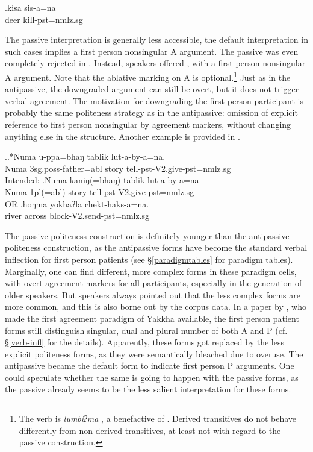 \exg.kisa sis-a=na\\
deer kill{\sc [3sg]-pst=nmlz.sg}\\
 

The passive interpretation is generally less accessible, the default interpretation in such cases implies a first person nonsingular A argument. The passive was even completely rejected in \Next[a]. Instead, speakers  offered \Next[b], with a first person nonsingular A argument. Note that the ablative marking on A is optional.\footnote{The verb is \emph{lumbiʔma} , a benefactive of . Derived transitives do not behave differently from non-derived transitives, at least not with regard to the passive construction.} Just as in the antipassive, the downgraded argument can still be overt, but it does not trigger verbal agreement. The motivation for downgrading the first person participant is  probably the same politeness strategy as in the antipassive: omission of explicit reference to first person nonsingular by agreement markers, without changing anything else in the structure. Another example is provided in \Next[c].  


\ex.\ag.*Numa u-ppa=bhaŋ tablik lut-a-by-a=na.\\
Numa {\sc 3sg.poss-}father{\sc =abl} story tell{\sc [3sg]-pst-V2.give-pst=nmlz.sg}\\
Intended: 
\bg.Numa kaniŋ(=bhaŋ) tablik lut-a-by-a=na\\
Numa  {\sc 1pl(=abl)} story tell{\sc [3sg]-pst-V2.give-pst=nmlz.sg}\\
 OR 
\bg.hoŋma  yokhaʔla chekt-haks-a=na.\\
river across block{\sc [3sg]-V2.send-pst=nmlz.sg} \\


The passive politeness construction is definitely younger than the antipassive politeness construction, as the antipassive forms have become the standard verbal inflection for first person patients (see §\ref{paradigmtables} for paradigm tables). Marginally, one can find different, more complex forms in these paradigm cells, with overt agreement markers for all participants, especially in the generation of older speakers. But speakers always pointed out that the less complex forms are more common, and this is also borne out by the corpus data. In a paper by \citet[425]{Gvozdanovic1987How}, who made the first agreement paradigm of Yakkha available, the first person patient forms still distinguish singular, dual and plural number of both A and P (cf. §\ref{verb-infl} for the details). Apparently, these forms got replaced by the less explicit politeness forms, as they were semantically bleached due to overuse. The antipassive became the default form to indicate first person P arguments. One could speculate whether the same is going to happen with the passive forms, as the passive already seems to be the less salient interpretation for these forms.




